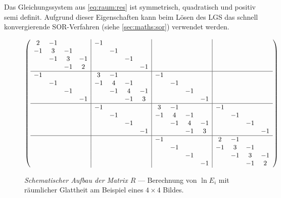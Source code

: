 Das Gleichungssystem aus \ref{eq:raum:res} ist symmetrisch, quadratisch und positiv semi definit. Aufgrund dieser Eigenschaften kann beim Lösen des \gls{LGS} das schnell konvergierende SOR-Verfahren (siehe \autoref{sec:maths:sor}) verwendet werden. 

\begin{figure}
  \begin{center}
\begin{align*}
    \left(
    \begin{array}{cccc|cccc|cccc|cccc}
    2 & -1 &   &    &-1 & & & & & & & & &    \\
    -1 & 3 & -1 &    & &-1 & & & && & & &    \\
    & -1 & 3 & -1    & & & -1 & & & & & & &    \\
    & & -1 & 2      & & & & -1 & & && & & &    \\
    \hline
    -1& & & &       3& -1 & & &     -1& & & &    \\
    & -1& & &       -1&4& -1 & &     &-1& & & &    \\
    & & -1&         & & -1 & 4 & -1& &&-1& & & &    \\    
    & & &-1         & & & -1 & 3 &  &&&-1& & & &    \\
    \hline
    & & & &    -1& & & &       3& -1 & & &     -1\\
    & & & &    & -1& & &       -1&4& -1 & &     &-1\\
    & & & &    & & -1&         & & -1 & 4 & -1& &&-1\\    
    & & & &    & & &-1         & & & -1 & 3 &  &&&-1\\
    \hline
    & & & &    & & & &    -1& & & &       2& -1\\
    & & & &    & & & &    & -1& & &       -1&3& -1\\
    & & & &    & & & &    & & -1&         & & -1 & 3 & -1\\    
    & & & &    & & & &    & & &-1         & & & -1 & 2\\
    \end{array}
    \right)
\end{align*}
\end{center}
\caption{\textit{Schematischer Aufbau der Matrix $R$} --- Berechnung von $\ln E_i$ mit räumlicher Glattheit am Beispiel eines $4 \times 4$ Bildes.}
\label{fig:raum:matrix}
\end{figure}


